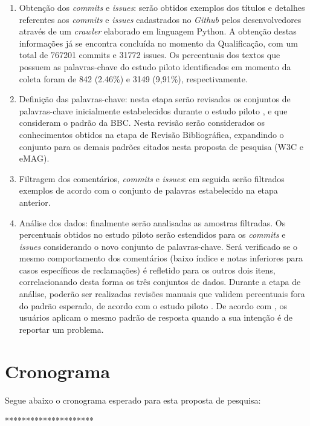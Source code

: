 \begin{enumerate}
	\item Obtenção dos \textit{commits} e \textit{issues}: serão obtidos exemplos dos títulos e detalhes referentes aos \textit{commits} e \textit{issues} cadastrados no \textit{Github} pelos desenvolvedores através de um \textit{crawler} elaborado em linguagem Python. A obtenção destas informações já se encontra concluída no momento da Qualificação, com um total de 767201 commits e 31772 issues.
	Os percentuais dos textos que possuem as palavras-chave do estudo piloto identificados em momento da coleta foram de 842 (2.46\%) e 3149 (9,91\%), respectivamente.
	
	\item Definição das palavras-chave: nesta etapa serão revisados os conjuntos de palavras-chave inicialmente estabelecidos durante o estudo piloto \cite{ihc2019}, e que consideram o padrão da BBC. Nesta revisão serão considerados os conhecimentos obtidos na etapa de Revisão Bibliográfica, expandindo o conjunto para os demais padrões citados nesta proposta de pesquisa (W3C e eMAG).
	
	\item Filtragem dos comentários, \textit{commits} e \textit{issues}: em seguida serão filtrados exemplos de acordo com o conjunto de palavras estabelecido na etapa anterior.
	
	\item Análise dos dados: finalmente serão analisadas as amostras filtradas. Os percentuais obtidos no estudo piloto serão estendidos para os \textit{commits} e \textit{issues} considerando o novo conjunto de palavras-chave. Será verificado se o mesmo comportamento dos comentários (baixo índice e notas inferiores para casos específicos de reclamações) é refletido para os outros dois itens, correlacionando desta forma os três conjuntos de dados.
	Durante a etapa de análise, poderão ser realizadas revisões manuais que validem percentuais fora do padrão esperado, de acordo com o estudo piloto \cite{ihc2019}. De acordo com \cite{Panichella2015how}, os usuários aplicam o mesmo padrão de resposta quando a sua intenção é de reportar um problema.	
\end{enumerate}


\section{Cronograma}

Segue abaixo o cronograma esperado para esta proposta de pesquisa:

*********************

